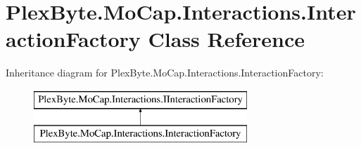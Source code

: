 \hypertarget{class_plex_byte_1_1_mo_cap_1_1_interactions_1_1_interaction_factory}{}\section{Plex\+Byte.\+Mo\+Cap.\+Interactions.\+Interaction\+Factory Class Reference}
\label{class_plex_byte_1_1_mo_cap_1_1_interactions_1_1_interaction_factory}
Inheritance diagram for Plex\+Byte.\+Mo\+Cap.\+Interactions.\+Interaction\+Factory\+:\begin{figure}[H]
\begin{center}
\leavevmode
\includegraphics[height=2.000000cm]{class_plex_byte_1_1_mo_cap_1_1_interactions_1_1_interaction_factory}
\end{center}
\end{figure}
